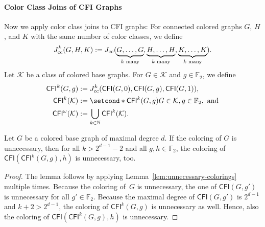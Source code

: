 \documentclass[]{lmcs}
\newcommand{\nat}{\mathbb{N}}
\newcommand{\FF}{\mathbb{F}}
\newcommand{\GraphClass}{\mathcal{K}}
\newcommand{\CFImsym}{\mathsf{CFI}^\omega}
\newcommand{\CFIm}[1]{\CFImsym(#1)}
\newcommand{\CFImk}[2]{\mathsf{CFI}^{#1}(#2)}
\newcommand{\CFIsym}{\mathsf{CFI}}
\newcommand{\CFI}[1]{\CFIsym(#1)}
\begin{document}
\paragraph{Color Class Joins of CFI Graphs}
Now we apply color class joins to CFI graphs:
For connected colored graphs $G$, $H$, and $K$ with the same number of color classes,
we define
\[J_{\text{cc}}^{k}(G, H, K) := J_{\text{cc}}(\underbrace{G, \dots , G}_{k \text{ many}}, \underbrace{H, \dots , H}_{k \text{ many}}, \underbrace{K, \dots , K}_{k \text{ many}}).\]
Let $\GraphClass$ be a class of colored base graphs.
For $G \in \GraphClass$ and $g \in \FF_2$, we define
\begin{align*}
	\CFImk{k}{G,g} &:= \ccjoink{k}{\CFI{G,0},\CFI{G,g},\CFI{G,1}},\\
	\CFImk{k}{\GraphClass} &:= \setcond*{\CFImk{k}{G,g}}{G \in \GraphClass, g \in \FF_2}, \text{ and}\\
	\CFIm{\GraphClass} &:= \bigcup_{k \in \nat} \CFImk{k}{\GraphClass}.
\end{align*}


\begin{lem}
	\label{lem:unnecessary-coloring-cfim}
	Let $G$ be a colored base graph of maximal degree $d$.
	If the coloring of $G$ is unnecessary,
	then for all $k > 2^{d-1}-2$ and all $g,h \in \FF_2$,
	the coloring of $\CFI{\CFImk{k}{G,g},h}$ is unnecessary, too.
\end{lem}
\begin{proof}
	The lemma follows by applying Lemma~\ref{lem:unnecessary-colorings} multiple times.
	Because the coloring of~$G$ is unnecessary, the one of $\CFI{G,g'}$ is unnecessary for all $g' \in \FF_2$.
	Because the maximal degree of $\CFI{G,g'}$ is $2^{d-1}$ and
	$k +2 > 2^{d-1}$, the coloring of $\CFImk{k}{G,g}$ is unnecessary as well.
	Hence, also the coloring of $\CFI{\CFImk{k}{G,g}, h}$ is unnecessary.
\end{proof}
\end{document}
